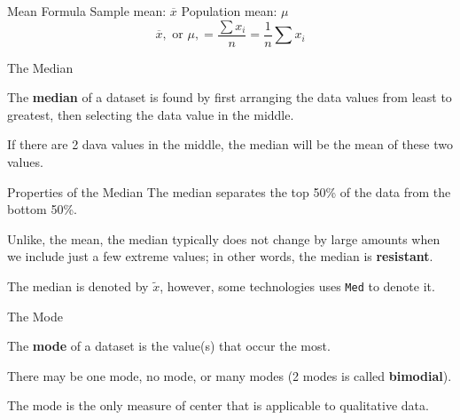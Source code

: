 \documentclass[t]{beamer}
\begin{document}
\begin{frame}{Mean Formula}
Sample mean: $\overline{x}$	\qquad	Population mean: $\mu$	\newline\\	\pause
\[ \overline{x}, \text{ or } \mu, = \frac{\sum x_i}{n} = \frac{1}{n}\sum x_i	\]
\end{frame}

\begin{frame}{The Median}

\begin{tcolorbox}[colframe=green!20!black, colback = green!30!white,title=\textbf{Median}]
The \textbf{median} of a dataset is found by first arranging the data values from least to greatest, then selecting the data value in the middle. 
\end{tcolorbox}
\vspace{11pt}	\pause

If there are 2 dava values in the middle, the median will be the mean of these two values.
\end{frame}

\begin{frame}{Properties of the Median}
The median separates the top 50\% of the data from the bottom 50\%.	\newline\\	\pause

Unlike, the mean, the median typically does not change by large amounts when we include just a few extreme values; in other words, the median is \textbf{resistant}.	\newline\\	\pause

The median is denoted by $\tilde{x}$, however, some technologies uses \texttt{Med} to denote it.
\end{frame}

\begin{frame}{The Mode}

\begin{tcolorbox}[colframe=green!20!black, colback = green!30!white,title=\textbf{Mode}]
The \textbf{mode} of a dataset is the value(s) that occur the most.
\end{tcolorbox}
\vspace{11pt}	\pause

There may be one mode, no mode, or many modes (2 modes is called \textbf{bimodial}).	\newline\\	\pause

The mode is the only measure of center that is applicable to qualitative data.
\end{frame}
\end{document}

